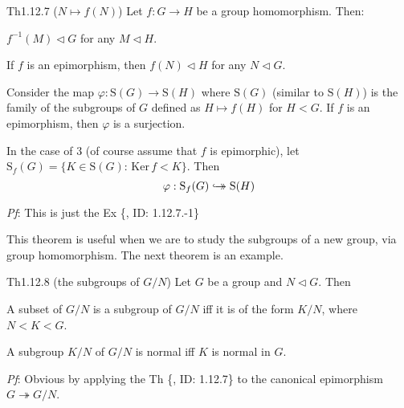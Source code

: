 \documentclass{article}
\newcommand{\nles}{\vartriangleleft}
\newcommand{\Ker}{\text{Ker}\,}
\newcommand{\hooktwoheadrightarrow}{%
        \hookrightarrow\mathrel{\mspace{-15mu}}\rightarrow}
\begin{document}
\begin{Th}{Th1.12.7 ($N\mapsto f(N)$)}
    Let $f: G\to H$ be a group homomorphism. Then:
    \begin{compactenum}
        \item $f^{-1}(M) \nles G$ for any $M\nles H$.
        \item If $f$ is an epimorphism, then $f(N)\nles H$ for any $N\nles G$.
        \item Consider the map $\varphi: \mathrm{S}(G)\to\mathrm{S}(H)$ where $\mathrm{S}(G)$ (similar to $\mathrm{S}(H)$) is the family of the subgroups of $G$ defined as $H\mapsto f(H)$ for $H<G$. If $f$ is an epimorphism, then $\varphi$ is a surjection.
        \item In the case of 3 (of course assume that $f$ is epimorphic), let $\mathrm{S}_f(G) = \{K\in\mathrm{S}(G): \,\Ker f<K\}$. Then 
        $$ \varphi: \mathrm{S}_f(G)\hooktwoheadrightarrow\mathrm{S}(H) $$
    \end{compactenum}
    \tcblower
    \textit{Pf}: This is just the Ex \{, ID: 1.12.7.-1\}
\end{Th}

\begin{Rmk}{}
    This theorem is useful when we are to study the subgroups of a new group, via group homomorphism. The next theorem is an example.
\end{Rmk}

\begin{Th}{Th1.12.8 (the subgroups of $G/N$)}
    Let $G$ be a group and $N\nles G$. Then
    \begin{compactenum}
        \item A subset of $G/N$ is a subgroup of $G/N$ iff it is of the form $K/N$, where $N<K<G$.
        \item A subgroup $K/N$ of $G/N$ is normal iff $K$ is normal in $G$.
    \end{compactenum}
    \tcblower
    \textit{Pf}: Obvious by applying the Th \{, ID: 1.12.7\} to the canonical epimorphism $G\twoheadrightarrow G/N$.
\end{Th}
\end{document}
